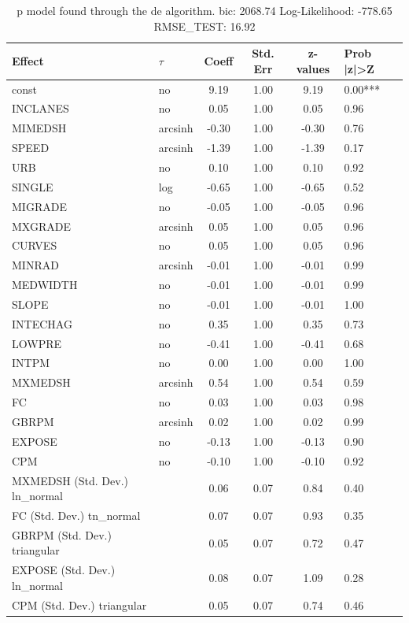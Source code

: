 \begin{table}
	\caption{p model found through the de algorithm. bic: 2068.74 Log-Likelihood: -778.65 RMSE_TEST: 16.92}
	\begin{center}
		\begin{tabular}{|l|l|c|c|c|l|}
			\hline
			Effect & $\tau$ & Coeff & Std. Err & z-values & Prob |z|>Z \\
			\hline
			const & no & 9.19 & 1.00 & 9.19 & 0.00*** \\
			\hline
			INCLANES & no & 0.05 & 1.00 & 0.05 & 0.96 \\
			\hline
			MIMEDSH & arcsinh & -0.30 & 1.00 & -0.30 & 0.76 \\
			\hline
			SPEED & arcsinh & -1.39 & 1.00 & -1.39 & 0.17 \\
			\hline
			URB & no & 0.10 & 1.00 & 0.10 & 0.92 \\
			\hline
			SINGLE & log & -0.65 & 1.00 & -0.65 & 0.52 \\
			\hline
			MIGRADE & no & -0.05 & 1.00 & -0.05 & 0.96 \\
			\hline
			MXGRADE & arcsinh & 0.05 & 1.00 & 0.05 & 0.96 \\
			\hline
			CURVES & no & 0.05 & 1.00 & 0.05 & 0.96 \\
			\hline
			MINRAD & arcsinh & -0.01 & 1.00 & -0.01 & 0.99 \\
			\hline
			MEDWIDTH & no & -0.01 & 1.00 & -0.01 & 0.99 \\
			\hline
			SLOPE & no & -0.01 & 1.00 & -0.01 & 1.00 \\
			\hline
			INTECHAG & no & 0.35 & 1.00 & 0.35 & 0.73 \\
			\hline
			LOWPRE & no & -0.41 & 1.00 & -0.41 & 0.68 \\
			\hline
			INTPM & no & 0.00 & 1.00 & 0.00 & 1.00 \\
			\hline
			MXMEDSH & arcsinh & 0.54 & 1.00 & 0.54 & 0.59 \\
			\hline
			FC & no & 0.03 & 1.00 & 0.03 & 0.98 \\
			\hline
			GBRPM & arcsinh & 0.02 & 1.00 & 0.02 & 0.99 \\
			\hline
			EXPOSE & no & -0.13 & 1.00 & -0.13 & 0.90 \\
			\hline
			CPM & no & -0.10 & 1.00 & -0.10 & 0.92 \\
			\hline
			MXMEDSH (Std. Dev.) ln_normal &  & 0.06 & 0.07 & 0.84 & 0.40 \\
			\hline
			FC (Std. Dev.) tn_normal &  & 0.07 & 0.07 & 0.93 & 0.35 \\
			\hline
			GBRPM (Std. Dev.) triangular &  & 0.05 & 0.07 & 0.72 & 0.47 \\
			\hline
			EXPOSE (Std. Dev.) ln_normal &  & 0.08 & 0.07 & 1.09 & 0.28 \\
			\hline
			CPM (Std. Dev.) triangular &  & 0.05 & 0.07 & 0.74 & 0.46 \\
			\hline
		\end{tabular}
	\end{center}
\end{table}